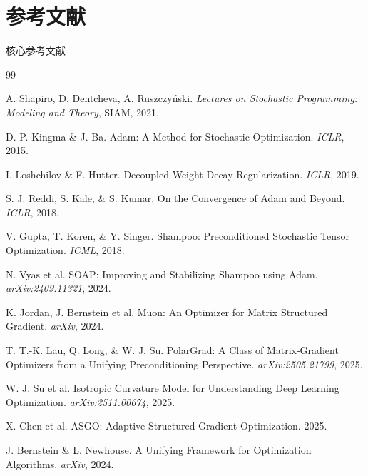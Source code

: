 \documentclass[aspectratio=169,10pt]{ctexbeamer}
\begin{document}
\section{参考文献}

\begin{frame}{核心参考文献}
\footnotesize
\begin{thebibliography}{99}

A. Shapiro, D. Dentcheva, A. Ruszczy\'nski.
\newblock \textit{Lectures on Stochastic Programming: Modeling and Theory}, SIAM, 2021.

D. P. Kingma \& J. Ba.
\newblock Adam: A Method for Stochastic Optimization. \textit{ICLR}, 2015.

I. Loshchilov \& F. Hutter.
\newblock Decoupled Weight Decay Regularization. \textit{ICLR}, 2019.

S. J. Reddi, S. Kale, \& S. Kumar.
\newblock On the Convergence of Adam and Beyond. \textit{ICLR}, 2018.

V. Gupta, T. Koren, \& Y. Singer.
\newblock Shampoo: Preconditioned Stochastic Tensor Optimization. \textit{ICML}, 2018.

N. Vyas et al.
\newblock SOAP: Improving and Stabilizing Shampoo using Adam. \textit{arXiv:2409.11321}, 2024.

K. Jordan, J. Bernstein et al.
\newblock Muon: An Optimizer for Matrix Structured Gradient. \textit{arXiv}, 2024.

T. T.-K. Lau, Q. Long, \& W. J. Su.
\newblock PolarGrad: A Class of Matrix-Gradient Optimizers from a Unifying Preconditioning Perspective. \textit{arXiv:2505.21799}, 2025.

W. J. Su et al.
\newblock Isotropic Curvature Model for Understanding Deep Learning Optimization. \textit{arXiv:2511.00674}, 2025.

X. Chen et al.
\newblock ASGO: Adaptive Structured Gradient Optimization. 2025.

J. Bernstein \& L. Newhouse.
\newblock A Unifying Framework for Optimization Algorithms. \textit{arXiv}, 2024.

\end{thebibliography}
\end{frame}
\end{document}
